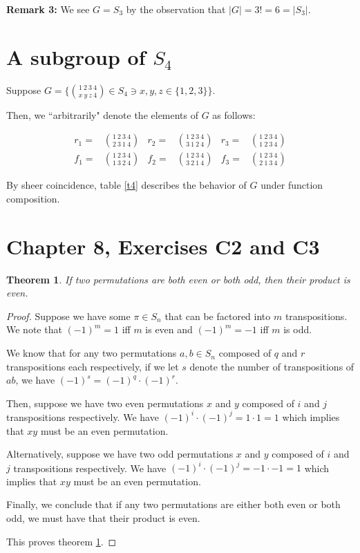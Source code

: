 \documentclass[12pt]{article}
\newtheorem{thm}{Theorem}
\begin{document}
\textbf{Remark 3:} We see $G = S_3$ by the observation that $|G| = 3! = 6 = |S_3|$.

\section{A subgroup of $S_4$}

Suppose $G = \{ \binom{1\ 2\ 3\ 4}{x\ y\ z\ 4} \in S_4 \ni x,y,z \in \{1,2,3\} \}$.

Then, we ``arbitrarily" denote the elements of $G$ as follows:

\begin{align}
	r_1 = & \binom{1\ 2\ 3\ 4}{2\ 3\ 1\ 4} &
	r_2 = & \binom{1\ 2\ 3\ 4}{3\ 1\ 2\ 4} &
	r_3 = & \binom{1\ 2\ 3\ 4}{1\ 2\ 3\ 4} \\
	f_1 = & \binom{1\ 2\ 3\ 4}{1\ 3\ 2\ 4} &
	f_2 = & \binom{1\ 2\ 3\ 4}{3\ 2\ 1\ 4} &
	f_3 = & \binom{1\ 2\ 3\ 4}{2\ 1\ 3\ 4}
\end{align}

By sheer coincidence, table \ref{t4} describes the behavior of $G$
under function composition.

\section{Chapter 8, Exercises C2 and C3}

\begin{thm} \label{thm2}
	If two permutations are both even or both odd,
	then their product is even.
\end{thm}

\begin{proof}
	Suppose we have some $\pi \in S_n$
	that can be factored
	into $m$ transpositions.
	We note that $(-1)^m = 1$ iff $m$ is even
	and $(-1)^m = -1$ iff $m$ is odd.
	
	We know that for any two permutations $a,b \in S_n$
	composed of $q$ and $r$ transpositions each respectively,
	if we let $s$ denote the number of transpositions
	of $ab$, we have $(-1)^s = (-1)^q \cdot (-1)^r$.

	Then, suppose we have two even permutations $x$ and $y$
	composed of $i$ and $j$ transpositions respectively.
	We have $(-1)^i \cdot (-1)^j = 1 \cdot 1 = 1$
	which implies that $xy$ must be an even permutation.

	Alternatively, suppose we have two odd permutations $x$ and $y$
	composed of $i$ and $j$ transpositions respectively.
	We have $(-1)^i \cdot (-1)^j = -1 \cdot -1 = 1$
	which implies that $xy$ must be an even permutation.

	Finally, we conclude that if any two permutations are
	either both even or both odd, we must have that
	their product is even.

	This proves theorem \ref{thm2}.
\end{proof}
\end{document}
